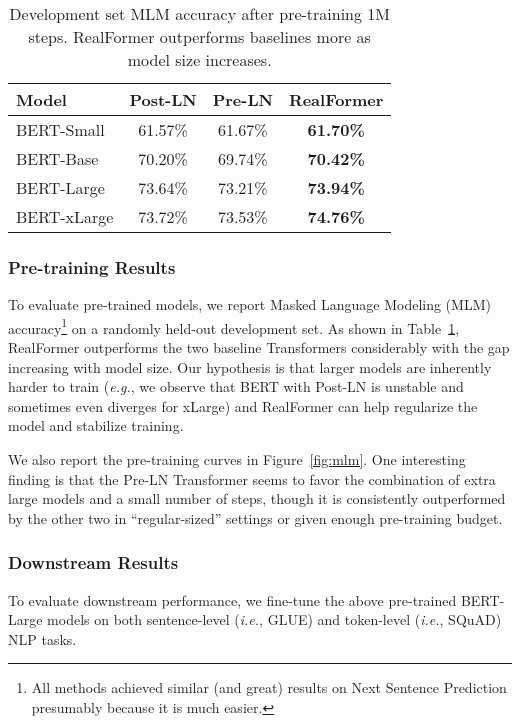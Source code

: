 \documentclass[11pt,a4paper]{article}
\begin{document}
\begin{table}
\setlength{\tabcolsep}{3.5pt}
\centering
\begin{tabular}{l|ccc}
\hline \textbf{Model} & \textbf{Post-LN} & \textbf{Pre-LN} & \textbf{RealFormer} \\ \hline
BERT-Small  & 61.57\%  & 61.67\%   & \textbf{61.70\%}  \\
BERT-Base   & 70.20\%  & 69.74\%   & \textbf{70.42\%}  \\
BERT-Large  & 73.64\%  & 73.21\%   & \textbf{73.94\%}  \\
BERT-xLarge & 73.72\%  & 73.53\%   & \textbf{74.76\%}  \\
\hline
\end{tabular}
\caption{Development set MLM accuracy after pre-training 1M steps. RealFormer outperforms baselines more as model size increases.}
\label{table:bert-mlm}
\end{table}


\subsubsection{Pre-training Results} \label{sec:pre-train}
To evaluate pre-trained models, we report Masked Language Modeling (MLM) accuracy\footnote{All methods achieved similar (and great) results on Next Sentence Prediction presumably because it is much easier.} on a randomly held-out development set. As shown in Table~\ref{table:bert-mlm}, RealFormer outperforms the two baseline Transformers considerably with the gap increasing with model size. 
Our hypothesis is that larger models are inherently harder to train (\emph{e.g.}, we observe that BERT with Post-LN is unstable and sometimes even diverges for xLarge) and RealFormer can help regularize the model and stabilize training. 

We also report the pre-training curves in Figure~\ref{fig:mlm}. One interesting finding is that the Pre-LN Transformer seems to favor the combination of extra large models and a small number of steps, though it is consistently outperformed by the other two in ``regular-sized'' settings or given enough pre-training budget. 



\subsubsection{Downstream Results}
To evaluate downstream performance, we fine-tune the above pre-trained BERT-Large models on both sentence-level (\emph{i.e.}, GLUE) and token-level (\emph{i.e.}, SQuAD) NLP tasks.
\end{document}
